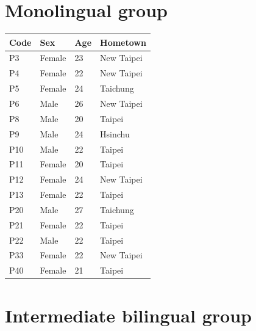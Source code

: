 \documentclass[12pt]{report}
\begin{document}
\begin{CJK}{UTF8}{bsmi}
\section{Monolingual group}

\begin{flushleft}
\begin{table}[hbt!]
\begin{tabularx}{\textwidth}{|l||X|X|X|}
\hline
Code&Sex&Age&Hometown\\
\hline
\hline
P3&Female&23&New Taipei\\
\hline
P4&Female&22&New Taipei\\
\hline
P5&Female&24&Taichung\\
\hline
P6&Male&26&New Taipei\\
\hline
P8&Male&20&Taipei\\
\hline
P9&Male&24&Hsinchu\\
\hline
P10&Male&22&Taipei\\
\hline
P11&Female&20&Taipei\\
\hline
P12&Female&24&New Taipei\\
\hline
P13&Female&22&Taipei\\
\hline
P20&Male&27&Taichung\\
\hline
P21&Female&22&Taipei\\
\hline
P22&Male&22&Taipei\\
\hline
P33&Female&22&New Taipei\\
\hline
P40&Female&21&Taipei\\
\hline

\end{tabularx}
\end{table}
\end{flushleft}

\pagebreak
\section{Intermediate bilingual group}


\end{CJK}
\end{document}
